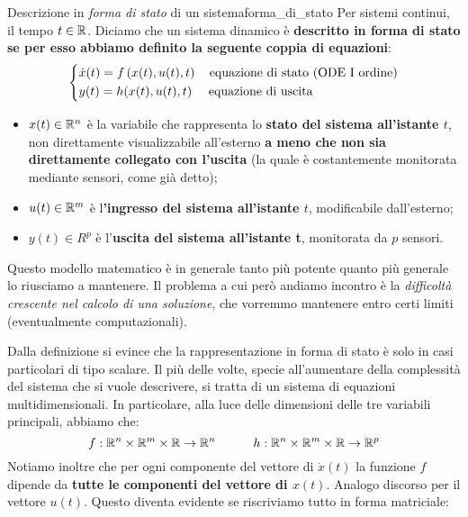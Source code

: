 \documentclass[a4paper]{report}
\begin{document}
\newpage
\begin{defin}{Descrizione in \textit{forma di stato} di un sistema}{forma_di_stato}
Per sistemi continui, il tempo $t \in \mathbb{R}$. Diciamo che un sistema dinamico è \textbf{descritto in forma di stato se per esso abbiamo definito la seguente coppia di equazioni}:
\begin{equation}
	\begin{dcases}
		\dot x(t) = f\left( x(t), u(t), t \right) \quad \textrm{equazione di stato (ODE I ordine)}\\
		y(t) = h(x(t), u(t), t) \quad \textrm{ equazione di uscita}
	\end{dcases}
\end{equation}
\begin{itemize}
	\item $x(t) \in \mathbb{R}^n$ è la variabile che rappresenta lo \textbf{stato del sistema all'istante $t$}, non direttamente visualizzabile all'esterno \textbf{a meno che non sia direttamente collegato con l'uscita} (la quale è costantemente monitorata mediante sensori, come già detto); 
	\item $u(t) \in \mathbb{R}^m$ è l\textbf{'ingresso del sistema all'istante $t$}, modificabile dall'esterno;
	\item $y(t) \in R^p$ è l'\textbf{uscita del sistema all'istante t}, monitorata da $p$ sensori. 
\end{itemize}
Questo modello matematico è in generale tanto più potente quanto più generale lo riusciamo a mantenere. Il problema a cui però andiamo incontro è la \textit{difficoltà crescente nel calcolo di una soluzione}, che vorremmo mantenere entro certi limiti (eventualmente computazionali).
\end{defin}

Dalla definizione si evince che la rappresentazione in forma di stato è solo in casi particolari di tipo scalare. Il più delle volte, specie all'aumentare della complessità del sistema che si vuole descrivere, si tratta di un sistema di equazioni multidimensionali. In particolare, alla luce delle dimensioni delle tre variabili principali, abbiamo che:
\begin{equation*}
	f:\mathbb{R}^n \times \mathbb{R}^m \times \mathbb{R} \rightarrow \mathbb{R}^n \quad \quad \quad h: \mathbb{R}^n \times \mathbb{R}^m \times \mathbb{R} \rightarrow \mathbb{R}^p
\end{equation*}
Notiamo inoltre che per ogni componente del vettore di $\dot x(t)$ la funzione $f$ dipende da \textbf{tutte le componenti del vettore di $x(t)$}.  Analogo discorso per il vettore $u(t)$. Questo diventa evidente se riscriviamo tutto in forma matriciale:
\end{document}
